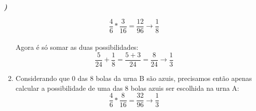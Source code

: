\documentclass[12pt]{article}
\newcounter{instn}
\newcommand{\instnum}{\arabic{instn}}
\newcommand{\myline}[1]{
    \emph{\textbf{#1)}}
    \addtocounter{instn}{1}
}
\newenvironment{question}
 {
    \myline{\instnum} 
    }
    {
 }
\begin{document}
\begin{question}
\begin{enumerate}[label={\textbf{\alph*)}}]
            \[
                \frac{4}{6} * \frac{3}{16} = \frac{12}{96} \rightarrow \frac{1}{8}    
            \]
            \\
            Agora é só somar as duas possibilidades: 
            \begin{equation}
                \frac{5}{24} + \frac{1}{8} = \frac{5+3}{24} = \frac{8}{24} \rightarrow \frac{1}{3} 
            \end{equation}

            \item Considerando que 0 das 8 bolas da urna B são azuis, precisamos então apenas calcular
            a possibilidade de uma das 8 bolas azuis ser escolhida na urna A: \\
            \begin{equation}
                \frac{4}{6} * \frac{8}{16} = \frac{32}{96} \rightarrow \frac{1}{3}    
            \end{equation}
            \\

        \end{enumerate}
    \end{question}

\end{document}
